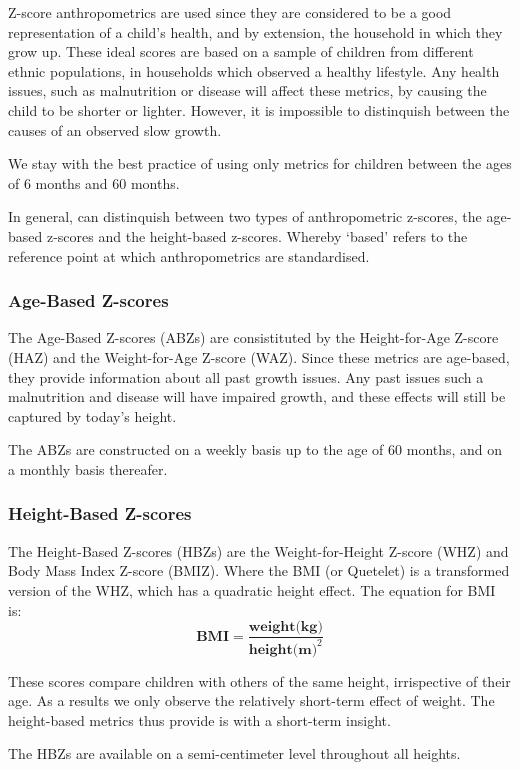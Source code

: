 \begin{refsection}
Z-score anthropometrics are used since they are considered to be a good representation of a child's health,
and by extension, the household in which they grow up.
These ideal scores are based on a sample of children from different ethnic populations,
in households which observed a healthy lifestyle.
Any health issues, such as malnutrition or disease will affect these metrics,
by causing the child to be shorter or lighter.
However, it is impossible to distinquish between the causes of an observed slow growth.

We stay with the best practice of using only metrics for children between the ages of 6 months and 60 months.

In general, can distinquish between two types of anthropometric z-scores, the age-based z-scores and the height-based z-scores.
Whereby `based' refers to the reference point at which anthropometrics are standardised.

\subsubsection{Age-Based Z-scores}
The Age-Based Z-scores (ABZs) are consistituted by the Height-for-Age Z-score (HAZ) and the Weight-for-Age Z-score (WAZ).
Since these metrics are age-based, they provide information about all past growth issues.
Any past issues such a malnutrition and disease will have impaired growth,
and these effects will still be captured by today's height.

The ABZs are constructed on a weekly basis up to the age of 60 months, and on a monthly basis thereafer.


\subsubsection{Height-Based Z-scores}
The Height-Based Z-scores (HBZs) are the Weight-for-Height Z-score (WHZ)
and Body Mass Index Z-score (BMIZ).
Where the BMI (or Quetelet) is a transformed version of the WHZ, which has a quadratic height effect.
The equation for BMI is:
\[
\textbf{BMI} = \frac{\textbf{weight(kg)}}{\textbf{height(m)}^2}
\]

These scores compare children with others of the same height, irrispective of their age.
As a results we only observe the relatively short-term effect of weight.
The height-based metrics thus provide is with a short-term insight.

The HBZs are available on a semi-centimeter level throughout all heights.


\end{refsection}
